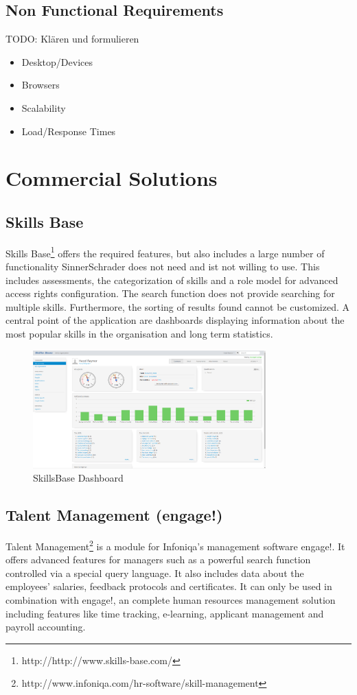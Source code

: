 \subsection{Non Functional Requirements}
TODO: Klären und formulieren
\begin{itemize}
	\item Desktop/Devices
	\item Browsers
	\item Scalability
	\item Load/Response Times
\end{itemize}



\section{Commercial Solutions}

\subsection{Skills Base}
Skills Base\footnote{http://http://www.skills-base.com/} offers the required features, but also includes a large number of functionality SinnerSchrader does not need and ist not willing to use. This includes assessments, the categorization of skills and a role model for advanced access rights configuration.
The search function does not provide searching for multiple skills. Furthermore, the sorting of results found cannot be customized. A central point of the application are dashboards displaying information about the most popular skills in the organisation and long term statistics.
\begin{figure}[!htp]
    \centering
    \includegraphics[width=0.8\textwidth]{images/skillsbase-dashboard.png}
    \caption{SkillsBase Dashboard}
    \label{fig:skillsbase_dashboard}
\end{figure}

\subsection{Talent Management (engage!)}
Talent Management\footnote{http://www.infoniqa.com/hr-software/skill-management} is a module for Infoniqa’s management software engage!. It offers advanced features for managers such as a powerful search function controlled via a special query language. It also includes data about the employees’ salaries, feedback protocols and certificates. It can only be used in combination with engage!, an complete human resources management solution including features like time tracking, e-learning, applicant management and payroll accounting.

